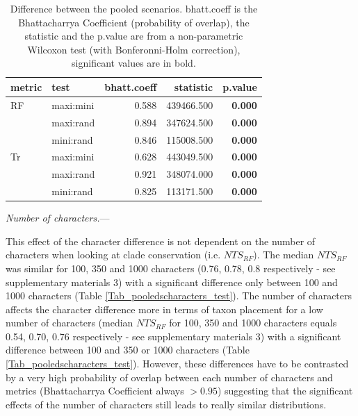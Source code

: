 \documentclass[12pt,letterpaper]{article}
\renewcommand{\subsubsection}[1]{%
\vspace{2ex}
\noindent
\textit{#1.}---}
\begin{document}
\begin{table}[ht]
\centering
\begin{tabular}{ll|r|rr}
  \hline
metric & test & bhatt.coeff & statistic & p.value \\ 
  \hline
RF & maxi:mini & 0.588 & 439466.500 & \textbf{0.000} \\ 
   & maxi:rand & 0.894 & 347624.500 & \textbf{0.000} \\ 
   & mini:rand & 0.846 & 115008.500 & \textbf{0.000} \\ 
Tr & maxi:mini & 0.628 & 443049.500 & \textbf{0.000} \\ 
   & maxi:rand & 0.921 & 348074.000 & \textbf{0.000} \\ 
   & mini:rand & 0.825 & 113171.500 & \textbf{0.000} \\ 
   \hline
\end{tabular}
\caption{Difference between the pooled scenarios. bhatt.coeff is the Bhattacharrya Coefficient (probability of overlap), the statistic and the p.value are from a non-parametric Wilcoxon test (with Bonferonni-Holm correction), significant values are in bold.} 
\label{Tab_pooledscenarios_test}
\end{table}

\subsubsection{Number of characters}

This effect of the character difference is not dependent on the number of characters when looking at clade conservation (i.e. $NTS_{RF}$).
The median $NTS_{RF}$ was similar for 100, 350 and 1000 characters (0.76, 0.78, 0.8 respectively - see supplementary materials 3) with a significant difference only between 100 and 1000 characters (Table \ref{Tab_pooledscharacters_test}).
The number of characters affects the character difference more in terms of taxon placement for a low number of characters (median $NTS_{RF}$ for 100, 350 and 1000 characters equals 0.54, 0.70, 0.76 respectively - see supplementary materials 3) with a significant difference between 100 and 350 or 1000 characters (Table \ref{Tab_pooledscharacters_test}).
However, these differences have to be contrasted by a very high probability of overlap between each number of characters and metrics (Bhattacharrya Coefficient always $>0.95$) suggesting that the significant effects of the number of characters still leads to really similar distributions.
\end{document}
